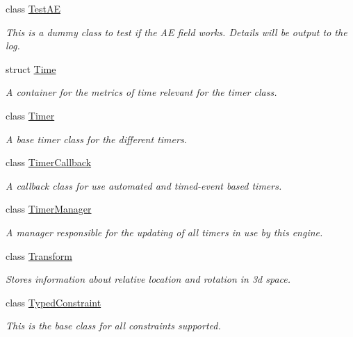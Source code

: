 \begin{DoxyCompactItemize}
class \hyperlink{classMezzanine_1_1TestAE}{TestAE}
\begin{DoxyCompactList}\small\item\em This is a dummy class to test if the AE field works. Details will be output to the log. \item\end{DoxyCompactList}\item 
struct \hyperlink{structMezzanine_1_1Time}{Time}
\begin{DoxyCompactList}\small\item\em A container for the metrics of time relevant for the timer class. \item\end{DoxyCompactList}\item 
class \hyperlink{classMezzanine_1_1Timer}{Timer}
\begin{DoxyCompactList}\small\item\em A base timer class for the different timers. \item\end{DoxyCompactList}\item 
class \hyperlink{classMezzanine_1_1TimerCallback}{TimerCallback}
\begin{DoxyCompactList}\small\item\em A callback class for use automated and timed-\/event based timers. \item\end{DoxyCompactList}\item 
class \hyperlink{classMezzanine_1_1TimerManager}{TimerManager}
\begin{DoxyCompactList}\small\item\em A manager responsible for the updating of all timers in use by this engine. \item\end{DoxyCompactList}\item 
class \hyperlink{classMezzanine_1_1Transform}{Transform}
\begin{DoxyCompactList}\small\item\em Stores information about relative location and rotation in 3d space. \item\end{DoxyCompactList}\item 
class \hyperlink{classMezzanine_1_1TypedConstraint}{TypedConstraint}
\begin{DoxyCompactList}\small\item\em This is the base class for all constraints supported. \item\end{DoxyCompactList}\item 

\end{DoxyCompactItemize}
